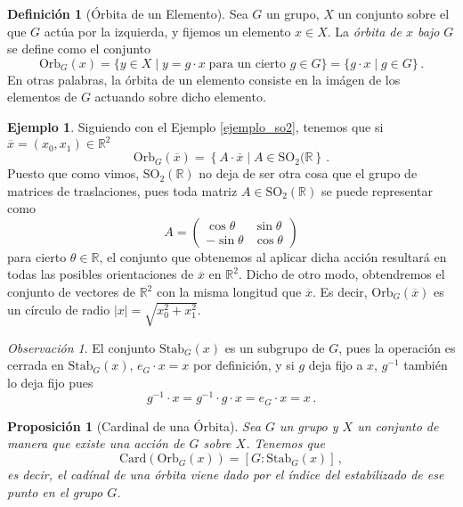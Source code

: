 \documentclass[a4paper,11pt]{amsart}
\theoremstyle{plain}
\newtheorem{prop}[thm]{Proposición}
\theoremstyle{definition}
\newtheorem{defi}[thm]{Definición}
\newtheorem{ej}[thm]{Ejemplo}
\theoremstyle{remark}
\newtheorem*{rem}{Observación}
\begin{document}
\begin{defi}[Órbita de un Elemento]
Sea $G$ un grupo, $X$ un conjunto sobre el que $G$ actúa por la izquierda, y fijemos un elemento $x \in X$. La \textit{órbita de $x$ bajo $G$} se define como el conjunto 
\[ \text{Orb}_G(x) = \{ y \in X \mid y = g \cdot x \; \text{para un cierto $g \in G$}\} = \{ g \cdot x \mid g \in G \} \, .\]
En otras palabras, la órbita de un elemento consiste en la imágen de los elementos de $G$ actuando sobre dicho elemento.
\end{defi}


\begin{ej}
Siguiendo con el Ejemplo \ref{ejemplo_so2}, tenemos que si $\overline{x} = (x_0, x_1) \in \mathbb{R}^2$
\[ \text{Orb}_G(\overline{x}) = \left\{ A \cdot \overline{x} \mid A \in \text{SO}_2(\mathbb{R}\right\} \, .\]
Puesto que como vimos, $\text{SO}_2(\mathbb{R})$ no deja de ser otra cosa que el grupo de matrices de traslaciones, pues toda matriz $A \in \text{SO}_2(\mathbb{R})$ se puede representar como 
\[ A = \begin{pmatrix}
    \cos \theta & \sin \theta \\
    -\sin \theta & \cos \theta 
\end{pmatrix} \]
para cierto $\theta \in \mathbb{R}$, el conjunto que obtenemos al aplicar dicha acción resultará en todas las posibles orientaciones de $\overline{x}$ en $\mathbb{R}^2$. Dicho de otro modo, obtendremos el conjunto de vectores de $\mathbb{R}^2$ con la misma longitud que $\overline{x}$. Es decir, $\text{Orb}_G(\overline{x})$ es un círculo de radio $|x| = \sqrt{x_0^2 + x_1^2}$.
\end{ej}
\begin{rem}
El conjunto $\text{Stab}_G(x)$ es un subgrupo de $G$, pues la operación es cerrada en $\text{Stab}_G(x)$, $e_G \cdot x = x$ por definición, y si $g$ deja fijo a $x$, $g^{-1}$ también lo deja fijo pues 
\[g^{-1} \cdot x = g^{-1} \cdot g \cdot x = e_G \cdot x = x \, .\]
\end{rem}

\begin{prop}[Cardinal de una Órbita]
Sea $G$ un grupo y $X$ un conjunto de manera que existe una acción de $G$ sobre $X$. Tenemos que 
\[ \text{Card}(\text{Orb}_G(x)) = [ G : \text{Stab}_G(x)] \, , \]
es decir, el cadínal de una órbita viene dado por el índice del estabilizado de ese punto en el grupo $G$. 
\end{prop}
\end{document}
